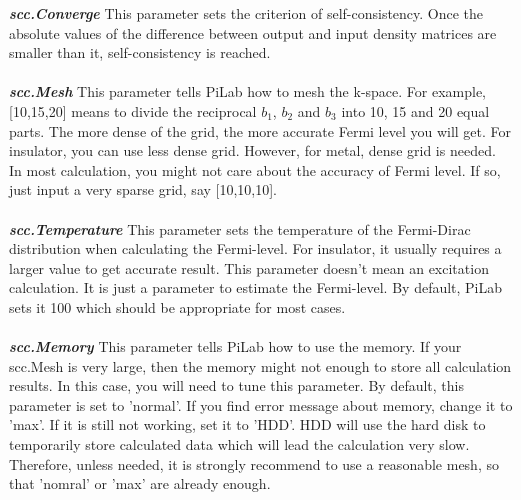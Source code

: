\documentclass[10pt,a4paper]{article}
\begin{document}
\textit{\textbf{scc.Converge}} This parameter sets the criterion of self-consistency. Once the absolute values of the difference between output and input density matrices are smaller than it, self-consistency is reached. \\ \\  
\textit{\textbf{scc.Mesh}} This parameter tells PiLab how to mesh the k-space. For example, [10,15,20] means to divide the reciprocal $b_{1}$, $b_{2}$ and $b_{3}$ into 10, 15 and 20 equal parts. The more dense of the grid, the more accurate Fermi level you will get. For insulator, you can use less dense grid. However, for metal, dense grid is needed. In most calculation, you might not care about the accuracy of Fermi level. If so, just input a very sparse grid, say [10,10,10].\\ \\
\textit{\textbf{scc.Temperature}} This parameter sets the temperature of the Fermi-Dirac distribution when calculating the Fermi-level. For insulator, it usually requires a larger value to get accurate result. This parameter doesn't mean an excitation calculation. It is just a parameter to estimate the Fermi-level. By default, PiLab sets it 100 which should be appropriate for most cases.\\ \\
\textit{\textbf{scc.Memory}} This parameter tells PiLab how to use the memory. If your scc.Mesh is very large, then the memory might not enough to store all calculation results. In this case, you will need to tune this parameter. By default, this parameter is set to 'normal'. If you find error message about memory, change it to 'max'. If it is still not working, set it to 'HDD'. HDD will use the hard disk to temporarily store calculated data which will lead the calculation very slow. Therefore, unless needed, it is strongly recommend to use a reasonable mesh, so that 'nomral' or 'max' are already enough.
  
\end{document}
